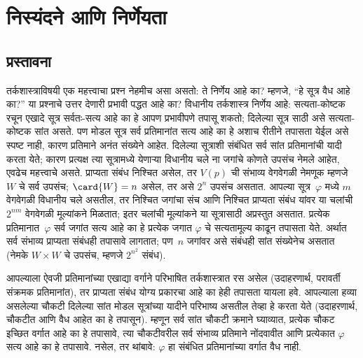 \chapter{निस्यंदने आणि निर्णेयता}\label{nml:fil:chap}










\section{प्रस्तावना}\label{nml:fil:int:sec}

तर्कशास्त्राविषयी एक महत्त्वाचा प्रश्न नेहमीच
असा असतो: ते निर्णेय आहे का? म्हणजे,
“हे सूत्र वैध आहे का?” या प्रश्नाचे
उत्तर देणारी प्रभावी पद्धत आहे का?
विधानीय तर्कशास्त्र निर्णेय आहे:
सत्यता-कोष्टक रचून एखादे
सूत्र सर्वतः-सत्य आहे का हे
आपण प्रभावीपणे तपासू शकतो;
दिलेल्या सूत्र साठी असे
सत्यता-कोष्टक सांत असते.
पण मोडल सूत्र सर्व प्रतिमानांत सत्य
आहे का हे अशाच रीतीने तपासता
येईल असे स्पष्ट नाही, कारण
प्रतिमाने अनंत संख्येने आहेत.
दिलेल्या सूत्राशी संबंधित सर्व
सांत प्रतिमानांची यादी करता येते;
कारण प्रत्यक्ष त्या सूत्रामध्ये
येणाऱ्या विधानीय चले
ना जगांचे कोणते उपसंच नेमले
आहेत, एवढेच महत्त्वाचे असते.
प्राप्यता संबंध निश्चित असेल,
तर $V(p)$ ची संभाव्य वेगवेगळी
नेमणूक म्हणजे~$W$ चे सर्व
उपसंच; $\card{W} = n$ असेल,
तर असे $2^n$ उपसंच असतात.
आपल्या सूत्र~$\varphi$ मध्ये
$m$ वेगवेगळी विधानीय चले असतील, तर निश्चित जगांचा संच आणि निश्चित
प्राप्यता संबंध यांवर या चलांची $2^{nm}$ वेगवेगळी
मूल्यांकने मिळतात; इतर चलांची मूल्यांकने या सूत्रासाठी अप्रस्तुत असतात. प्रत्येक
प्रतिमानात~$\varphi$ सर्व जगांत
सत्य आहे का हे प्रत्येक जगात
$\varphi$ चे सत्यतामूल्य काढून
तपासता येते. अर्थात सर्व
संभाव्य प्राप्यता संबंधही
तपासावे लागतात; पण~$n$
जगांवर असे संबंधही सांत
संख्येनेच असतात (नेमके
$W \times W$ चे उपसंच,
म्हणजे $2^{n^2}$ संबंध).

आपल्याला  ऐवजी
प्रतिमानांच्या एखाद्या वर्गाने
परिभाषित तर्कशास्त्रात रस
असेल (उदाहरणार्थ,
परावर्ती संक्रमक प्रतिमानांत),
तर प्राप्यता संबंध योग्य प्रकारचा
आहे का हेही तपासता यायला हवे.
आपल्याला हव्या असलेल्या चौकटी
दिलेल्या सांत मोडल सूत्रांच्या यादीने परिभाष्य
असतील तेव्हा हे करता येते
(उदाहरणार्थ, चौकटीत 
आणि  वैध आहेत का
हे तपासून). म्हणून सर्व सांत
चौकटी क्रमाने घ्याव्यात,
प्रत्येक चौकट इच्छित वर्गात
आहे का हे तपासावे,
त्या चौकटीवरील सर्व संभाव्य
प्रतिमाने नोंदवावीत आणि
प्रत्येकात $\varphi$ सत्य आहे का
हे तपासावे. नसेल, तर थांबावे:
$\varphi$ हा संबंधित प्रतिमानांच्या
वर्गात वैध नाही.

